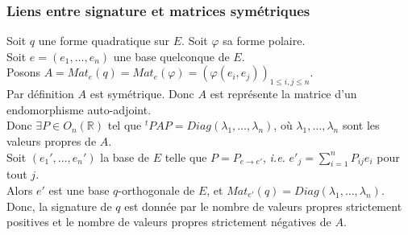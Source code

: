 \documentclass{article}
\begin{document}

\subsubsection{Liens entre signature et matrices symétriques}

Soit $q$ une forme quadratique sur $E$. Soit $\varphi$ sa forme polaire.\\
Soit $e=(e_1, \ldots, e_n)$ une base quelconque de $E$.\\
Posons $A = Mat_e(q) = Mat_e(\varphi) = (\varphi(e_i, e_j))_{1 \leq i,j \leq n}$.\\
Par définition $A$ est symétrique. Donc $A$ est représente la matrice d'un endomorphisme auto-adjoint.\\
Donc $\exists P \in O_n(\mathbb{R})$ tel que ${}^t P A P = Diag(\lambda_1, \ldots, \lambda_n)$, où $\lambda_1, \ldots, \lambda_n$ sont les valeurs propres de $A$.\\
Soit $(e_1', \ldots, e_n')$ la base de $E$ telle que $P = P_{e \to e'}$, \textit{i.e.} $e'_j = \sum_{i=1}^n P_{ij} e_i$ pour tout $j$.\\
Alors $e'$ est une base $q$-orthogonale de $E$, et $Mat_{e'}(q) = Diag(\lambda_1, \ldots, \lambda_n)$.\\
Donc, la signature de $q$ est donnée par le nombre de valeurs propres strictement positives et le nombre de valeurs propres strictement négatives de $A$.

\newpage
\tableofcontents
\end{document}
